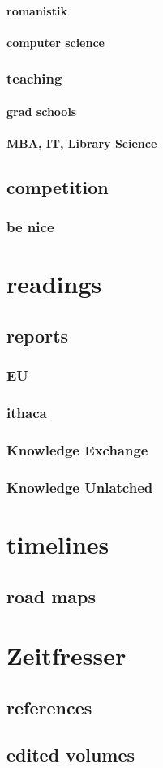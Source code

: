 \documentclass[output=guidelines,guidelines] {langscibook}
\begin{document}
\subsubsection{romanistik}
\subsubsection{computer science}
\subsection{teaching}
\subsubsection{grad schools}
\subsubsection{MBA, IT, Library Science}
\section{competition}
\subsection{be nice}
\chapter{readings}
\section{reports}
\subsection{EU}
\subsection{ithaca}
\subsection{Knowledge Exchange}
\subsection{Knowledge Unlatched}
\chapter{timelines}
\section{road maps}
\chapter{Zeitfresser}
\section{references}
\section{edited volumes}
\end{document}
